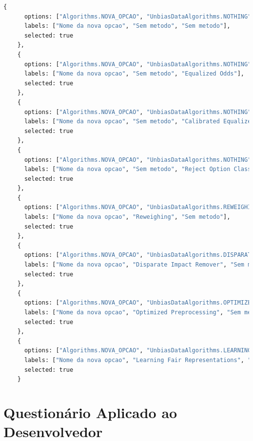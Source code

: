 \documentclass[Portugues,Final]{ic-tese-v3}
\begin{document}
\begin{lstlisting}[language=Python, label=cod:AddPlanningConfig]
    {
      options: ["Algorithms.NOVA_OPCAO", "UnbiasDataAlgorithms.NOTHING", "UnbiasPostProcAlgorithms.NOTHING"],
      labels: ["Nome da nova opcao", "Sem metodo", "Sem metodo"],
      selected: true
    },
    {
      options: ["Algorithms.NOVA_OPCAO", "UnbiasDataAlgorithms.NOTHING", "UnbiasPostProcAlgorithms.EQUALIZED_ODDS"],
      labels: ["Nome da nova opcao", "Sem metodo", "Equalized Odds"],
      selected: true
    },
    {
      options: ["Algorithms.NOVA_OPCAO", "UnbiasDataAlgorithms.NOTHING", "UnbiasPostProcAlgorithms.CALIBRATED_EQUALIZED_ODDS"],
      labels: ["Nome da nova opcao", "Sem metodo", "Calibrated Equalized Odds"],
      selected: true
    },
    {
      options: ["Algorithms.NOVA_OPCAO", "UnbiasDataAlgorithms.NOTHING", "UnbiasPostProcAlgorithms.REJECT_OPTION_CLASSIFICATION"],
      labels: ["Nome da nova opcao", "Sem metodo", "Reject Option Classification"],
      selected: true
    },
    {
      options: ["Algorithms.NOVA_OPCAO", "UnbiasDataAlgorithms.REWEIGHING", "UnbiasPostProcAlgorithms.NOTHING"],
      labels: ["Nome da nova opcao", "Reweighing", "Sem metodo"],
      selected: true
    },
    {
      options: ["Algorithms.NOVA_OPCAO", "UnbiasDataAlgorithms.DISPARATE_IMPACT_REMOVER", "UnbiasPostProcAlgorithms.NOTHING"],
      labels: ["Nome da nova opcao", "Disparate Impact Remover", "Sem metodo"],
      selected: true
    },
    {
      options: ["Algorithms.NOVA_OPCAO", "UnbiasDataAlgorithms.OPTIMIZED_PREPROCESSING", "UnbiasPostProcAlgorithms.NOTHING"],
      labels: ["Nome da nova opcao", "Optimized Preprocessing", "Sem metodo"],
      selected: true
    },
    {
      options: ["Algorithms.NOVA_OPCAO", "UnbiasDataAlgorithms.LEARNING_FAIR_REPRESENTATIONS", "UnbiasPostProcAlgorithms.NOTHING"],
      labels: ["Nome da nova opcao", "Learning Fair Representations", "Sem metodo"],
      selected: true
    }
\end{lstlisting}

\chapter{Questionário Aplicado ao Desenvolvedor}
\label{ann:Questionary}
\end{document}
